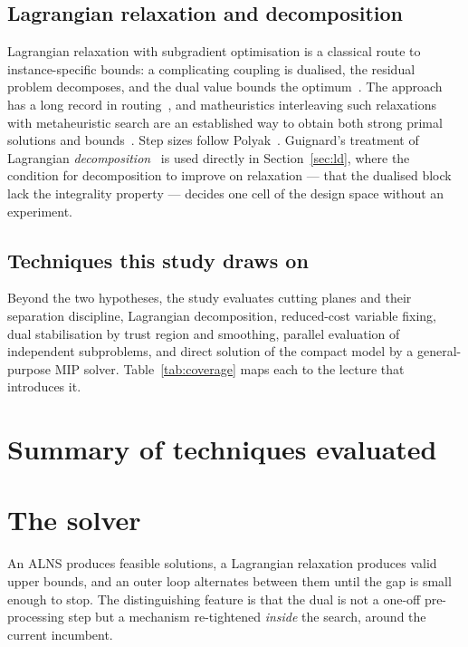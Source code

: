 \documentclass[11pt,a4paper]{article}
\begin{document}
\subsection{Lagrangian relaxation and decomposition}

Lagrangian relaxation with subgradient optimisation is a classical route to
instance-specific bounds: a complicating coupling is dualised, the residual
problem decomposes, and the dual value bounds the
optimum~\cite{Fisher1981Lagrangian,Held1974Subgradient,Guignard2003Lagrangean}.
The approach has a long record in
routing~\cite{Fisher1997VRPTW,Kohl1999LagrangeVRPTW}, and matheuristics
interleaving such relaxations with metaheuristic search are an established way to
obtain both strong primal solutions and
bounds~\cite{ArchettiSperanza2014Matheuristic}. Step sizes follow
Polyak~\cite{PolyakStepSize}. Guignard's treatment of Lagrangian
\emph{decomposition}~\cite{Guignard2003Lagrangean} is used directly in
Section~\ref{sec:ld}, where the condition for decomposition to improve on
relaxation --- that the dualised block lack the integrality property --- decides one
cell of the design space without an experiment.

\subsection{Techniques this study draws on}

Beyond the two hypotheses, the study evaluates cutting planes and their separation
discipline, Lagrangian decomposition, reduced-cost variable fixing, dual
stabilisation by trust region and smoothing, parallel evaluation of independent
subproblems, and direct solution of the compact model by a general-purpose MIP
solver. Table~\ref{tab:coverage} maps each to the lecture that introduces it.

\section{Summary of techniques evaluated}\label{sec:coverage}



\section{The solver}\label{sec:solver}

An ALNS produces feasible solutions, a Lagrangian relaxation produces valid upper
bounds, and an outer loop alternates between them until the gap is small enough to
stop. The distinguishing feature is that the dual is not a one-off pre-processing
step but a mechanism re-tightened \emph{inside} the search, around the current
incumbent.
\end{document}

